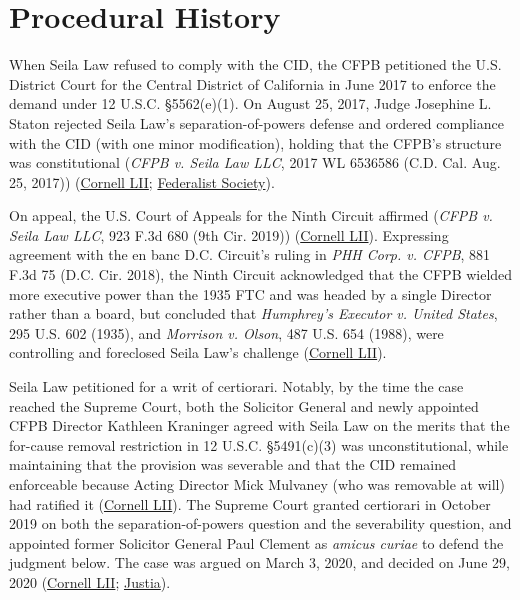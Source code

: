 \documentclass[12pt]{article}
\begin{document}
\section{Procedural History}

When Seila Law refused to comply with the CID, the CFPB petitioned the U.S. District Court for the Central District of California in June 2017 to enforce the demand under 12 U.S.C. \S 5562(e)(1). On August 25, 2017, Judge Josephine L. Staton rejected Seila Law's separation-of-powers defense and ordered compliance with the CID (with one minor modification), holding that the CFPB's structure was constitutional (\textit{CFPB v. Seila Law LLC}, 2017 WL 6536586 (C.D. Cal. Aug. 25, 2017)) (\href{https://www.law.cornell.edu/supremecourt/text/19-7}{Cornell LII}; \href{https://fedsoc.org/case/seila-law-llc-v-consumer-financial-protection-bureau}{Federalist Society}).

On appeal, the U.S. Court of Appeals for the Ninth Circuit affirmed (\textit{CFPB v. Seila Law LLC}, 923 F.3d 680 (9th Cir. 2019)) (\href{https://www.law.cornell.edu/supremecourt/text/19-7}{Cornell LII}). Expressing agreement with the en banc D.C. Circuit's ruling in \textit{PHH Corp. v. CFPB}, 881 F.3d 75 (D.C. Cir. 2018), the Ninth Circuit acknowledged that the CFPB wielded more executive power than the 1935 FTC and was headed by a single Director rather than a board, but concluded that \textit{Humphrey's Executor v. United States}, 295 U.S. 602 (1935), and \textit{Morrison v. Olson}, 487 U.S. 654 (1988), were controlling and foreclosed Seila Law's challenge (\href{https://www.law.cornell.edu/supremecourt/text/19-7}{Cornell LII}).

Seila Law petitioned for a writ of certiorari. Notably, by the time the case reached the Supreme Court, both the Solicitor General and newly appointed CFPB Director Kathleen Kraninger agreed with Seila Law on the merits that the for-cause removal restriction in 12 U.S.C. \S 5491(c)(3) was unconstitutional, while maintaining that the provision was severable and that the CID remained enforceable because Acting Director Mick Mulvaney (who was removable at will) had ratified it (\href{https://www.law.cornell.edu/supremecourt/text/19-7}{Cornell LII}). The Supreme Court granted certiorari in October 2019 on both the separation-of-powers question and the severability question, and appointed former Solicitor General Paul Clement as \textit{amicus curiae} to defend the judgment below. The case was argued on March 3, 2020, and decided on June 29, 2020 (\href{https://www.law.cornell.edu/supremecourt/text/19-7}{Cornell LII}; \href{https://supreme.justia.com/cases/federal/us/591/19-7/}{Justia}).
\end{document}
